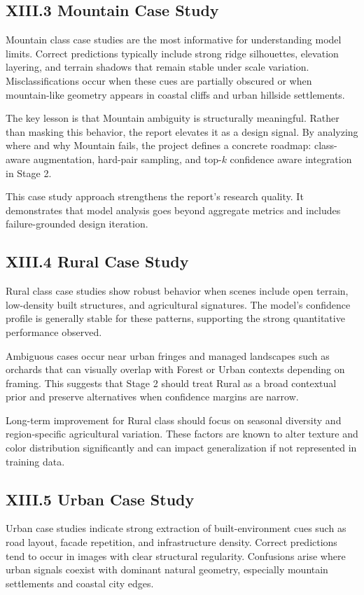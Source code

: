\subsection*{XIII.3 Mountain Case Study}
Mountain class case studies are the most informative for understanding model limits. Correct predictions typically include strong ridge silhouettes, elevation layering, and terrain shadows that remain stable under scale variation. Misclassifications occur when these cues are partially obscured or when mountain-like geometry appears in coastal cliffs and urban hillside settlements.

The key lesson is that Mountain ambiguity is structurally meaningful. Rather than masking this behavior, the report elevates it as a design signal. By analyzing where and why Mountain fails, the project defines a concrete roadmap: class-aware augmentation, hard-pair sampling, and top-$k$ confidence aware integration in Stage 2.

This case study approach strengthens the report's research quality. It demonstrates that model analysis goes beyond aggregate metrics and includes failure-grounded design iteration.

\subsection*{XIII.4 Rural Case Study}
Rural class case studies show robust behavior when scenes include open terrain, low-density built structures, and agricultural signatures. The model's confidence profile is generally stable for these patterns, supporting the strong quantitative performance observed.

Ambiguous cases occur near urban fringes and managed landscapes such as orchards that can visually overlap with Forest or Urban contexts depending on framing. This suggests that Stage 2 should treat Rural as a broad contextual prior and preserve alternatives when confidence margins are narrow.

Long-term improvement for Rural class should focus on seasonal diversity and region-specific agricultural variation. These factors are known to alter texture and color distribution significantly and can impact generalization if not represented in training data.

\subsection*{XIII.5 Urban Case Study}
Urban case studies indicate strong extraction of built-environment cues such as road layout, facade repetition, and infrastructure density. Correct predictions tend to occur in images with clear structural regularity. Confusions arise where urban signals coexist with dominant natural geometry, especially mountain settlements and coastal city edges.

